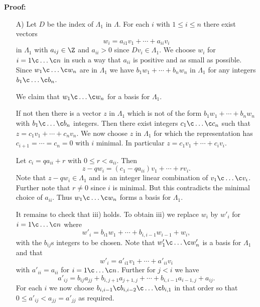 \textbf{Proof:}
\begin{enumerate}
\item[A)] Let $D$ be the index of $\Lambda_1$ in $\Lambda$.  For each $i$ with $1\leq i\leq n$ there exist vectors
\[ w_i = a_{i1}v_1 + \dotsb + a_{ii}v_i \]
in $\Lambda_1$ with $a_{ij}\in\Z$ and $a_{ii}>0$ since $Dv_i\in\Lambda_1$.  We choose $w_i$ for $i=1\c \dotsc\c n$ in such a way that $a_{ii}$ is positive and as small as possible.  Since $w_1\c \dotsc\c w_n$ are in $\Lambda_1$ we have $b_1w_1+\dotsb+b_nw_n$ in $\Lambda_1$ for any integers $b_1\c \dotsc\c b_n$.

We claim that $w_1\c \dotsc\c w_n$ for a basis for $\Lambda_1$.

If not then there is a vector $z$ in $\Lambda_1$ which is not of the form $b_1w_1+\dotsb+b_nw_n$ with $b_1\c \dotsc\c b_n$ integers.  Then there exist integers $c_1\c \dotsc\c c_n$ such that $z=c_1v_1+\dotsb+c_nv_n$.  We now choose $z$ in $\Lambda_1$ for which the representation has $c_{i+1}=\dotsb=c_n=0$ with $i$ minimal.  In particular $z=c_1v_1+\dotsb+c_iv_i$.

Let $c_i=qa_{ii}+r$ with $0\leq r<a_{ii}$.  Then
\[ z-qw_i = (c_1-qa_{ii})v_1+\dotsb+rv_i . \]
Note that $z-qw_i\in\Lambda_1$ and is an integer linear combination of $v_1\c \dotsc\c v_i$.  Further note that $r\neq0$ since $i$ is minimal.  But this contradicts the minimal choice of $a_{ii}$.  Thus $w_1\c \dotsc\c w_n$ forms a basis for $\Lambda_1$.

It remains to check that iii) holds.  To obtain iii) we replace $w_i$ by $w'_i$ for $i=1\c \dotsc\c n$ where
\[ w'_i = b_{i1}w_1 + \dotsb + b_{i,i-1}w_{i-1} + w_i , \]
with the $b_{ij}$s integers to be chosen.  Note that $w'_1\c \dotsc\c w'_n$ is a basis for $\Lambda_1$ and that
\[ w'_i = a'_{i1}v_1 + \dotsb + a'_{ii}v_i \]
with $a'_{ii}=a_{ii}$ for $i=1\c \dotsc\c n$.  Further for $j<i$ we have
\[ a'_{ij} = b_{ij}a_{jj} + b_{i,j+1}a_{j+1,j} + \dotsb + b_{i,i-1}a_{i-1,j} + a_{ij} . \]
For each $i$ we now choose $b_{i,i-1}\c b_{i,i-2}\c \dotsc\c b_{i,1}$ in that order so that $0\leq a'_{ij}<a_{jj}=a'_{jj}$ as required.
\end{enumerate}